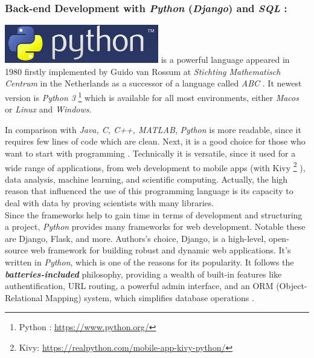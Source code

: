 \documentclass[12pt,a4paper]{report}
\begin{document}
	\subsubsection{Back-end Development with \textit{Python} (\textit{Django}) and \textit{SQL} :}  
	\includegraphics[width=0.2\linewidth]{pythonImage.png}
	 is a powerful language appeared in 1980 firstly implemented by Guido van Rossum at \textit{Stichting Mathematisch Centrum} in the Netherlands as a successor of a language called  \textit{ABC} \cite{tulchak2016history}. It newest version is \textit{Python 3} \footnote{Python : \url{https://www.python.org/}}  which is available for all most environments, either \textit{Macos} or \textit{Linux} and \textit{Windows}.
	 
	 In comparison with \textit{Java, C, C++, MATLAB}, \textit{Python} is more readable, since it requires few lines of code which are clean. Next, it is a good choice for those who want to start with programming \cite{bogdanchikov2013python}. Technically it is versatile, since it used for a wide range of applications, from web development to mobile apps (with Kivy \footnote{Kivy: \url{ https://realpython.com/mobile-app-kivy-python/}} ), data analysis, machine learning, and scientific computing. Actually, the high reason that influenced the use of this programming language is its capacity to deal with data by proving scientists with many libraries. \\
	 
	 Since the frameworks help to gain time in terms of development and structuring a project, \textit{Python} provides many frameworks for web development. Notable these are Django, Flask, and more. Authors's choice, Django, is a high-level, open-source web framework for building robust and dynamic web applications. It's written in \textit{Python}, which is one of the reasons for its popularity. It follows the \textbf{\textit{batteries-included}} philosophy, providing a wealth of built-in features like authentification, URL routing, a powerful admin interface, and an ORM (Object-Relational Mapping) system, which simplifies database operations \cite{alchin2013pro}. \\
	 
\end{document}
